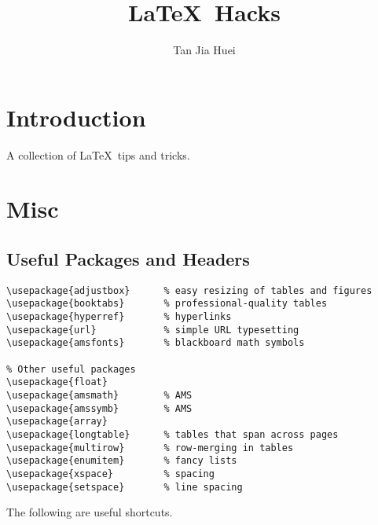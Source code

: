 \documentclass{article}
\title{\LaTeX\ Hacks}
\author{Tan Jia Huei \\ \tit{Project started on March 2019}}
\begin{document}
\maketitle




\section{Introduction}
\label{sec: Introduction}

A collection of \LaTeX\ tips and tricks.



\section{Misc}
\label{sec: Misc}

\subsection{Useful Packages and Headers}
\label{subsec: Useful Packages Headers}

\begin{lstlisting}[language={[LaTeX]TeX}, caption={Useful packages to import.}]
\usepackage{adjustbox}      % easy resizing of tables and figures
\usepackage{booktabs}       % professional-quality tables
\usepackage{hyperref}       % hyperlinks
\usepackage{url}            % simple URL typesetting
\usepackage{amsfonts}       % blackboard math symbols

% Other useful packages
\usepackage{float}
\usepackage{amsmath}        % AMS
\usepackage{amssymb}        % AMS
\usepackage{array}
\usepackage{longtable}      % tables that span across pages
\usepackage{multirow}       % row-merging in tables
\usepackage{enumitem}       % fancy lists
\usepackage{xspace}         % spacing
\usepackage{setspace}       % line spacing
\end{lstlisting}

The following are useful shortcuts.
\end{document}
